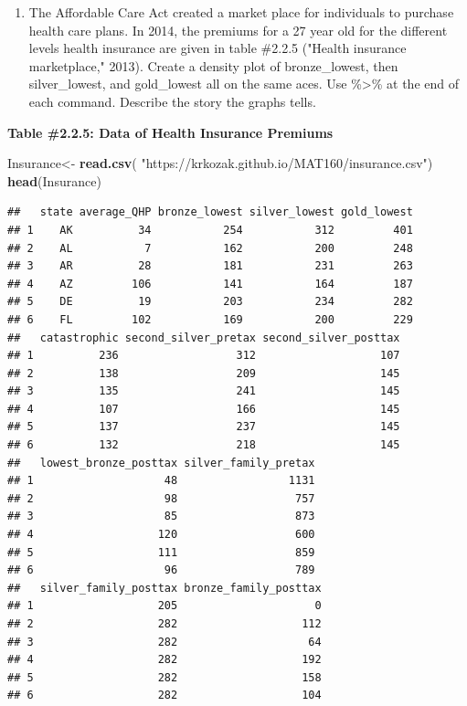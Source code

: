 \documentclass[
]{book}
\newenvironment{Shaded}{\begin{snugshade}}{\end{snugshade}}
\newcommand{\KeywordTok}[1]{\textcolor[rgb]{0.13,0.29,0.53}{\textbf{#1}}}
\newcommand{\NormalTok}[1]{#1}
\newcommand{\StringTok}[1]{\textcolor[rgb]{0.31,0.60,0.02}{#1}}
\providecommand{\tightlist}{%
  \setlength{\itemsep}{0pt}\setlength{\parskip}{0pt}}
\begin{document}
\begin{enumerate}
\def\labelenumi{\arabic{enumi}.}
\setcounter{enumi}{2}
\tightlist
\item
  The Affordable Care Act created a market place for individuals to purchase health care plans. In 2014, the premiums for a 27 year old for the different levels health insurance are given in table \#2.2.5 ("Health insurance marketplace," 2013). Create a density plot of bronze\_lowest, then silver\_lowest, and gold\_lowest all on the same aces. Use \%\textgreater\% at the end of each command. Describe the story the graphs tells.
\end{enumerate}

\textbf{Table \#2.2.5: Data of Health Insurance Premiums}

\begin{Shaded}
\begin{Highlighting}[]
\NormalTok{Insurance<-}\StringTok{ }\KeywordTok{read.csv}\NormalTok{(}
  \StringTok{"https://krkozak.github.io/MAT160/insurance.csv"}\NormalTok{)}
\KeywordTok{head}\NormalTok{(Insurance)}
\end{Highlighting}
\end{Shaded}

\begin{verbatim}
##   state average_QHP bronze_lowest silver_lowest gold_lowest
## 1    AK          34           254           312         401
## 2    AL           7           162           200         248
## 3    AR          28           181           231         263
## 4    AZ         106           141           164         187
## 5    DE          19           203           234         282
## 6    FL         102           169           200         229
##   catastrophic second_silver_pretax second_silver_posttax
## 1          236                  312                   107
## 2          138                  209                   145
## 3          135                  241                   145
## 4          107                  166                   145
## 5          137                  237                   145
## 6          132                  218                   145
##   lowest_bronze_posttax silver_family_pretax
## 1                    48                 1131
## 2                    98                  757
## 3                    85                  873
## 4                   120                  600
## 5                   111                  859
## 6                    96                  789
##   silver_family_posttax bronze_family_posttax
## 1                   205                     0
## 2                   282                   112
## 3                   282                    64
## 4                   282                   192
## 5                   282                   158
## 6                   282                   104
\end{verbatim}
\end{document}
